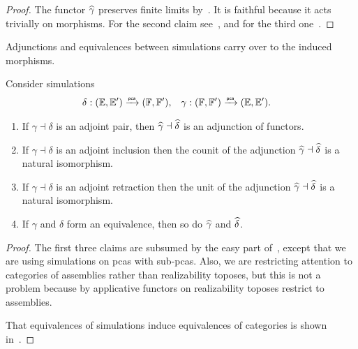 \begin{proof}
  The functor $\widehat{\gamma}$ preserves finite limits
  by~\cite[Proposition~2.2.2]{Longley:94}. It is faithful
  because it acts trivially on morphisms.
  For the second claim see~\cite[Theorem~2.4.12]{Longley:94}, and for the third one~\cite[Theorem~2.4.19]{Longley:94}.
\end{proof}

Adjunctions and equivalences between simulations carry over to the induced morphisms.

\begin{theorem}
  \label{th:applicative_adjunction_functor_adjunction}%
  Consider simulations
  \begin{align*}
    \delta &: ({\mathbb{E}}, {\mathbb{E}'}) \xrightarrow{\scriptscriptstyle\mathsf{pca}}{} ({\mathbb{F}}, {\mathbb{F}'}),
    &
    \gamma &: ({\mathbb{F}}, {\mathbb{F}'}) \xrightarrow{\scriptscriptstyle\mathsf{pca}}{} ({\mathbb{E}}, {\mathbb{E}'}).
  \end{align*}
  \begin{enumerate}
  \item If $\gamma \dashv \delta$ is an adjoint pair, then
    $\widehat{\gamma} \dashv \widehat{\delta}$ is an adjunction of functors.
  \item If $\gamma \dashv \delta$ is an adjoint inclusion then the counit of the adjunction $\widehat{\gamma} \dashv \widehat{\delta}$ is a natural isomorphism.
  \item If $\gamma \dashv \delta$ is an adjoint retraction then the unit of the adjunction $\widehat{\gamma} \dashv \widehat{\delta}$ is a natural isomorphism.
  \item If $\gamma$ and $\delta$ form an equivalence, then so do $\widehat{\gamma}$ and
    $\widehat{\delta}$.
  \end{enumerate}
\end{theorem}

\begin{proof}
  The first three claims are subsumed by the easy part of~\cite[Proposition 2.5.9]{Longley:94}, except that we are using simulations on pcas with sub-pcas. Also, we are restricting attention to categories of assemblies rather than realizability toposes, but this is not a problem because by applicative functors on realizability toposes restrict to assemblies.

  That equivalences of simulations induce equivalences of categories is shown in~\cite[Theorem 2.5.6]{Longley:94}.
\end{proof}

